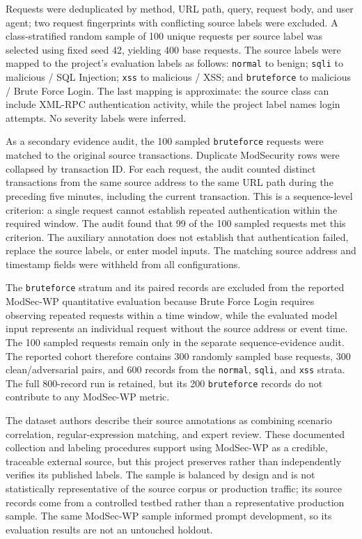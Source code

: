 Requests were deduplicated by method, URL path, query, request body, and
user agent; two request fingerprints with conflicting source labels
were excluded. A class-stratified random sample of 100 unique requests
per source label was selected using fixed seed 42, yielding 400 base
requests. The source labels were mapped to the project's evaluation
labels as follows: \texttt{normal} to benign; \texttt{sqli} to malicious
/ SQL Injection; \texttt{xss} to malicious / XSS; and
\texttt{bruteforce} to malicious / Brute Force Login. The last mapping
is approximate: the source class can include XML-RPC authentication
activity, while the project label names login attempts. No severity
labels were inferred.

As a secondary evidence audit, the 100 sampled \texttt{bruteforce}
requests were matched to the original source transactions. Duplicate
ModSecurity rows were collapsed by transaction ID. For each request, the
audit counted distinct transactions from the same source address to the
same URL path during the preceding five minutes, including the current
transaction. This is a sequence-level criterion: a single request
cannot establish repeated authentication within the required window.
The audit found that 99 of the 100 sampled requests met this criterion.
The auxiliary annotation does not establish that authentication failed,
replace the source labels, or enter model inputs. The matching source
address and timestamp fields were withheld from all configurations.

The \texttt{bruteforce} stratum and its paired records are excluded from
the reported ModSec-WP quantitative evaluation because Brute Force
Login requires observing repeated requests within a time window, while
the evaluated model input represents an individual request without the
source address or event time. The 100 sampled requests remain only in
the separate sequence-evidence audit. The reported cohort therefore
contains 300 randomly sampled base requests, 300 clean/adversarial
pairs, and 600 records from the \texttt{normal}, \texttt{sqli}, and
\texttt{xss} strata. The full 800-record run is retained, but its 200
\texttt{bruteforce} records do not contribute to any ModSec-WP metric.

The dataset authors describe their source annotations as combining
scenario correlation, regular-expression matching, and expert review.
These documented collection and labeling procedures support using
ModSec-WP as a credible, traceable external source, but this project
preserves rather than independently verifies its published labels. The
sample is balanced by design and is not statistically representative of
the source corpus or production traffic; its source records come from a
controlled testbed rather than a representative production sample. The
same ModSec-WP sample informed
prompt development, so its evaluation results are not an untouched
holdout.


